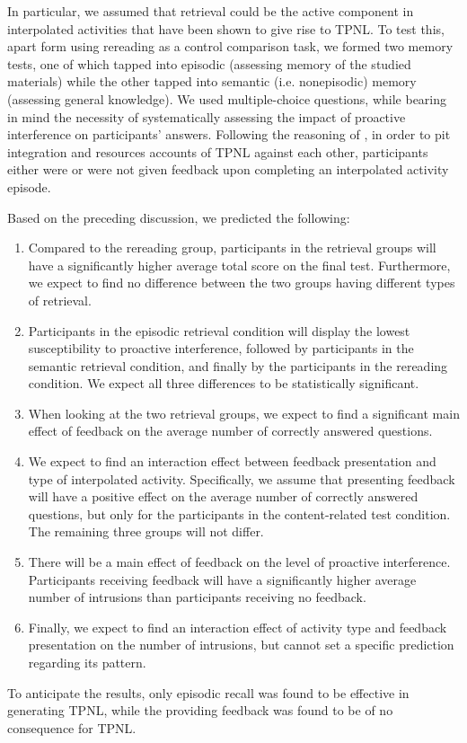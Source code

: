 \documentclass[../main.tex]{subfiles}
\begin{document}
In particular, we assumed that retrieval could be the active component in
interpolated activities that have been shown to give rise to TPNL. To test this,
apart form using rereading as a control comparison task,
we formed two memory tests, one of which tapped into episodic
(assessing memory of the studied materials) while the other tapped into semantic
(i.e. nonepisodic) memory (assessing general knowledge). We used multiple-choice 
questions, while bearing in mind the necessity of systematically assessing the 
impact of proactive interference on participants' answers. Following the 
reasoning of \cite{chanRetrievalPotentiatesNew2018}, in order to
pit integration and resources accounts of TPNL against each other, participants 
either were or were not given feedback upon completing an interpolated activity 
episode. 

Based on the preceding discussion, we predicted the following:
\begin{enumerate}[label = H\arabic*:, ref = hypothesis \arabic*]
    \itemsep0pt
    \item\label{h1} Compared to the rereading group, participants in the retrieval groups
        will have a significantly higher average total score on the final
        test. Furthermore, we expect to find no difference between the two
        groups having different types of retrieval.
    \item\label{h2} Participants in the episodic retrieval condition will display
    	the lowest susceptibility to proactive interference, followed by participants
        in the semantic retrieval condition, and finally by the participants in
        the rereading condition. We expect all three differences to be
        statistically significant.
    \item\label{h3} When looking at the two retrieval groups, we
        expect to find a significant main effect of feedback on the average
        number of correctly answered questions.
    \item\label{h4} We expect to find an interaction effect between feedback
        presentation and type of interpolated activity. Specifically, we assume
        that presenting feedback will have a positive effect on the average
        number of correctly answered questions, but only for the participants in
        the content-related test condition. The remaining three groups will not
        differ.
    \item\label{h5} There will be a main effect of feedback on the level of
    	proactive interference. Participants receiving feedback will have
        a significantly higher average number of intrusions
        than participants receiving no feedback.
    \item\label{h6} Finally, we expect to find an interaction effect of activity
    	type and feedback presentation on the number of intrusions, but
        cannot set a specific prediction regarding its pattern.

\end{enumerate}  

To anticipate the results, only episodic recall was found to be effective in 
generating TPNL, while the providing feedback was found to be of no consequence for TPNL.


 
{
	\biblio
}
\end{document}
